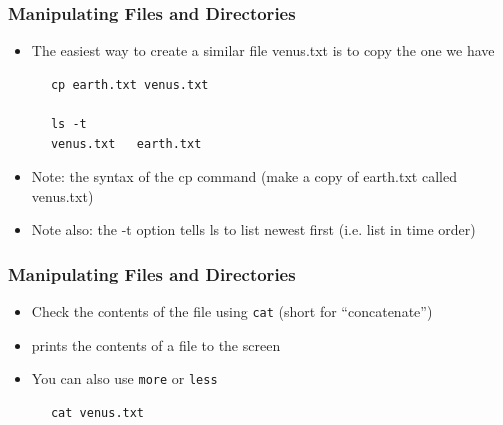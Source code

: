 \documentclass{beamer}
\begin{document}
\begin{frame}[fragile]\frametitle{Manipulating Files and Directories}
\begin{itemize}
\item The easiest way to create a similar file venus.txt is to copy the one we have
\end{itemize}
\begin{block}{}
\begin{lstlisting}
      cp earth.txt venus.txt

      ls -t
      venus.txt   earth.txt
\end{lstlisting}
\end{block}
\begin{itemize}      
    \item Note: the syntax of the cp command (make a copy of earth.txt called venus.txt)
    \item Note also: the -t option tells ls to list newest first (i.e. list in time order)
\end{itemize}	
\end{frame}

\begin{frame}[fragile]\frametitle{Manipulating Files and Directories}
\begin{itemize}
    \item Check the contents of the file using \lstinline!cat! (short for “concatenate”)
    \item prints the contents of a file to the screen
    \item You can also use \lstinline!more! or \lstinline!less!
\end{itemize}	
\begin{block}{}
\begin{lstlisting}
      cat venus.txt
\end{lstlisting}
\end{block}
\end{frame}
\end{document}
